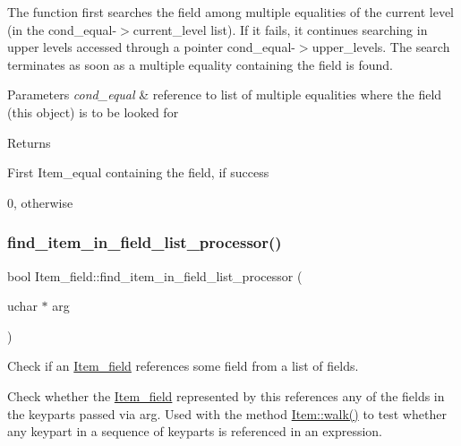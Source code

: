 The function first searches the field among multiple equalities of the current level (in the cond\+\_\+equal-\/$>$current\+\_\+level list). If it fails, it continues searching in upper levels accessed through a pointer cond\+\_\+equal-\/$>$upper\+\_\+levels. The search terminates as soon as a multiple equality containing the field is found.


\begin{DoxyParams}{Parameters}
{\em cond\+\_\+equal} & reference to list of multiple equalities where the field (this object) is to be looked for\\
\hline
\end{DoxyParams}
\begin{DoxyReturn}{Returns}

\begin{DoxyItemize}
\item First Item\+\_\+equal containing the field, if success
\item 0, otherwise 
\end{DoxyItemize}
\end{DoxyReturn}
\mbox{\label{classItem__field_a067634a6cb5c51fb8a68a91fd1c45b36}} 
\subsubsection{\texorpdfstring{find\+\_\+item\+\_\+in\+\_\+field\+\_\+list\+\_\+processor()}{find\_item\_in\_field\_list\_processor()}}
{\footnotesize\ttfamily bool Item\+\_\+field\+::find\+\_\+item\+\_\+in\+\_\+field\+\_\+list\+\_\+processor (\begin{DoxyParamCaption}\item[{uchar $\ast$}]{arg }\end{DoxyParamCaption})\hspace{0.3cm}{\ttfamily [virtual]}}

Check if an \mbox{\hyperlink{classItem__field}{Item\+\_\+field}} references some field from a list of fields.

Check whether the \mbox{\hyperlink{classItem__field}{Item\+\_\+field}} represented by \textquotesingle{}this\textquotesingle{} references any of the fields in the keyparts passed via \textquotesingle{}arg\textquotesingle{}. Used with the method \mbox{\hyperlink{classItem_ab7d2529511c14a77e59a1b1bbabc95d7}{Item\+::walk()}} to test whether any keypart in a sequence of keyparts is referenced in an expression.


